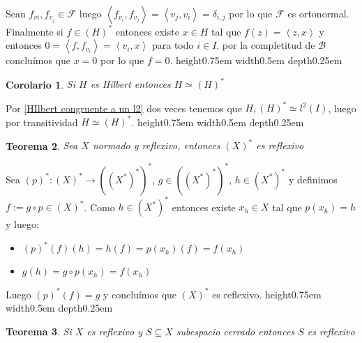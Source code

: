 \documentclass[11pt]{article}
\newcommand{\B}{\mathcal{B}}
\newcommand{\F}{\mathcal{F}}
\newcommand{\dual}[1]{\left(#1\right)^{\ast}}
\newcommand{\ddual}[1]{\left(#1^{\ast}\right)^{\ast}}
\newcommand{\ip}[1]{\left\langle#1\right\rangle}
\newtheorem{theorem}{Teorema}
\numberwithin{theorem}{subsection}
\newtheorem{corollary}[theorem]{Corolario}
\newenvironment{proof}[1][Demostraci\'on]{\begin{trivlist}
		\item[\hskip \labelsep {\bfseries #1}]}{\end{trivlist}}
\newcommand{\qed}{\nobreak \ifvmode \relax \else
	\ifdim\lastskip<1.5em \hskip-\lastskip
	\hskip1.5em plus0em minus0.5em \fi \nobreak
	\vrule height0.75em width0.5em depth0.25em\fi}
\begin{document}
\begin{proof}
	Sean $f_{v{i}}, f_{v_j} \in \F$ luego $\ip{f_{v_i},f_{v_j}} = \ip{v_j,v_i} = \delta_{i,j}$ por lo que $\F$ es ortonormal. Finalmente si $f \in \dual{H}$ entonces existe $x \in H$ tal que $f(z) = \ip{z,x}$ y entonces $0 = \ip{f,f_{v_i}} = \ip{v_i,x}$ para todo $i \in I$, por la completitud de $\B$ conclu\'imos que $x = 0$ por lo que $f = 0$. \qed
\end{proof}

\begin{corollary}
	\label{Hilbert es autodual}
	Si $H$ es Hilbert entonces $H \simeq \dual{H}$
\end{corollary}

\begin{proof}
	Por \ref{HIlbert congruente a un l2} dos veces tenemos que $H,\dual{H} \simeq l^2(I)$, luego por transitividad $H \simeq \dual{H}$. \qed
\end{proof}

\begin{theorem}
	\label{Si X es reflexivo entonces su dual lo es}
	Sea $X$ normado y reflexivo, entonces $\dual{X}$ es reflexivo
\end{theorem}

\begin{proof}
	Sea $\dual{p}: \dual{X} \rightarrow \dual{\ddual{X}}$, $g \in \dual{\ddual{X}}$, $h \in \ddual{X}$ y definimos $f := g \circ p \in \dual{X}$. Como $h \in \ddual{X}$ entonces existe $x_h \in X$ tal que $p(x_h) = h$ y luego:
	
		\begin{itemize}
			\item $\dual{p}(f)(h) = h(f) = p(x_h)(f) = f(x_h)$
			\item $g(h) = g \circ p (x_h) = f(x_h)$
		\end{itemize}
	
	Luego $\dual{p}(f) = g$ y conclu\'imos que $\dual{X}$ es reflexivo. \qed
	
	
\end{proof}

\begin{theorem}
	\label{Cerrado en reflexivo es reflexivo}
	Si $X$ es reflexivo y $S \subseteq X$ subespacio cerrado entonces $S$ es reflexivo
\end{theorem}
\end{document}

